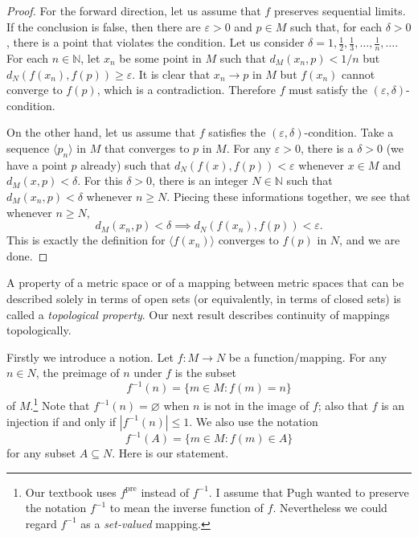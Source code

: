 \begin{proof}
  For the forward direction, let us assume that $f$ preserves sequential limits.
  If the conclusion is false, then there are $\varepsilon > 0$ and $p \in M$ such that, for each $\delta > 0$, there is a point that violates the condition.
  Let us consider $\delta = 1, \frac12, \frac13, \dots, \frac1n, \dots$.
  For each $n \in \mathbb{N}$, let $x_n$ be some point in $M$ such that $d_M(x_n, p) < 1/n$ but $d_N( f(x_n), f(p) ) \geqslant \varepsilon$. 
  It is clear that $x_n \to p$ in $M$ but $f(x_n)$ cannot converge to $f(p)$, which is a contradiction.
  Therefore $f$ must satisfy the $(\varepsilon, \delta)$-condition.

  On the other hand, let us assume that $f$ satisfies the $(\varepsilon, \delta)$-condition.
  Take a sequence $\langle p_n \rangle$ in $M$ that converges to $p$ in $M$.
  For any $\varepsilon > 0$, there is a $\delta > 0$ (we have a point $p$ already) such that $d_N(f(x), f(p)) < \varepsilon$ whenever $x \in M$ and $d_M(x,p) < \delta$.
  For this $\delta > 0$, there is an integer $N \in \mathbb{N}$ such that $d_M( x_n, p ) < \delta$ whenever $n \geqslant N$.
  Piecing these informations together, we see that whenever $n \geqslant N$,
  \[
    d_M(x_n, p) < \delta \implies d_N \left( f(x_n), f(p) \right) < \varepsilon.
  \]
  This is exactly the definition for $\langle f(x_n) \rangle$ converges to $f(p)$ in $N$, 
  and we are done.
\end{proof}
A property of a metric space or of a mapping between metric spaces that can be described solely in terms of open sets (or equivalently, in terms of closed sets) is called a \textit{topological property}.
Our next result describes continuity of mappings topologically.

Firstly we introduce a notion.
Let $f : M \to N$ be a function/mapping.
For any $n \in N$, the \textsf{preimage} of $n$ under $f$ is the subset
\[
  f^{-1}(n) = \{ m \in M \colon f(m) = n \}
\]
of $M$.\footnote{Our textbook uses $f^{\text{pre}}$ instead of $f^{-1}$.  I assume that Pugh wanted to preserve the notation $f^{-1}$ to mean the inverse function of $f$.  Nevertheless we could regard $f^{-1}$ as a \textit{set-valued} mapping.}
Note that $f^{-1}(n) = \varnothing$ when $n$ is not in the image of $f$; also that $f$ is an injection if and only if $|f^{-1}(n)| \leqslant 1$.
We also use the notation
\[
  f^{-1}(A) = \{ m \in M \colon f(m) \in A \}
\]
for any subset $A \subseteq N$.
Here is our statement.

